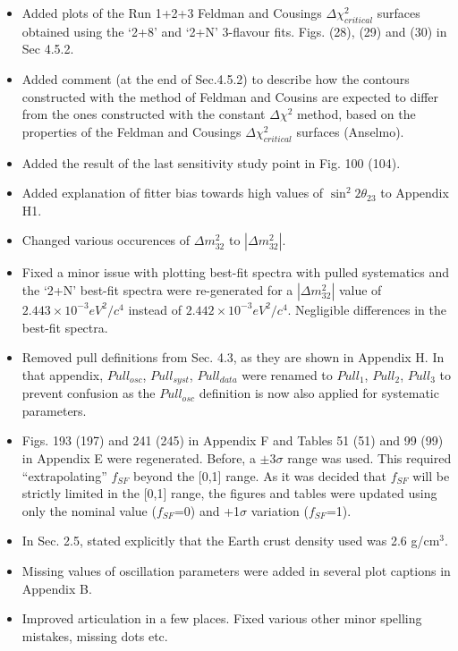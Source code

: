 \begin{itemize}
\item
Added plots of the Run 1+2+3 Feldman and Cousings $\Delta\chi^{2}_{critical}$ surfaces
obtained using the `2+8' and `2+N' 3-flavour fits. 
Figs. {\color{red}(28)}, {\color{red}(29)} and {\color{red}(30)} in Sec 4.5.2.
\checkmark

\item
Added comment (at the end of Sec.4.5.2) to describe how the contours constructed with the method of Feldman and Cousins
are expected to differ from the ones constructed with the constant $\Delta \chi^{2}$ method,
based on the properties of the  Feldman and Cousings $\Delta\chi^{2}_{critical}$ surfaces (Anselmo). \checkmark

\item
Added the result of the last sensitivity study point in Fig. 100 {\color{red}(104)}. \checkmark

\item
Added explanation of fitter bias towards high values of $\sin^{2}2\theta_{23}$ to Appendix H1. \checkmark

\item
Changed various occurences of $\Delta m^{2}_{32}$ to $|\Delta m^{2}_{32}|$. \checkmark

\item
Fixed a minor issue with plotting best-fit spectra with pulled systematics and the `2+N' best-fit spectra
were re-generated for a $|{\Delta}m^{2}_{32}|$ value of 
$2.443 \times 10^{-3} eV^2/c^4$ instead of $2.442 \times 10^{-3} eV^2/c^4$.
Negligible differences in the best-fit spectra. \checkmark

\item
Removed pull definitions from Sec. 4.3, as they are shown in Appendix H.
In that appendix, $Pull_{osc}$, $Pull_{syst}$, $Pull_{data}$ were renamed to $Pull_{1}$, $Pull_{2}$, $Pull_{3}$
to prevent confusion as the $Pull_{osc}$ definition is now also applied for systematic parameters. \checkmark

\item
Figs. 193  {\color{red}(197)} and 241  {\color{red}(245)} in Appendix F and
Tables 51 {\color{red}(51)} and 99 {\color{red}(99)} in Appendix E were regenerated.
Before, a $\pm$3$\sigma$ range was used.
This required ``extrapolating'' $f_{SF}$ beyond the [0,1] range.
As it was decided that $f_{SF}$ will be strictly limited in the [0,1] range,
the figures and tables were updated using only the nominal value ($f_{SF}$=0) and
+1$\sigma$ variation ($f_{SF}$=1). \checkmark

\item
In Sec. 2.5, stated explicitly that the Earth crust density used was 2.6 g/cm$^{3}$. \checkmark

\item
Missing values of oscillation parameters were added in several plot captions in Appendix B. \checkmark

\item
Improved articulation in a few places. 
Fixed various other minor spelling mistakes, missing dots etc. \checkmark

\end{itemize}






